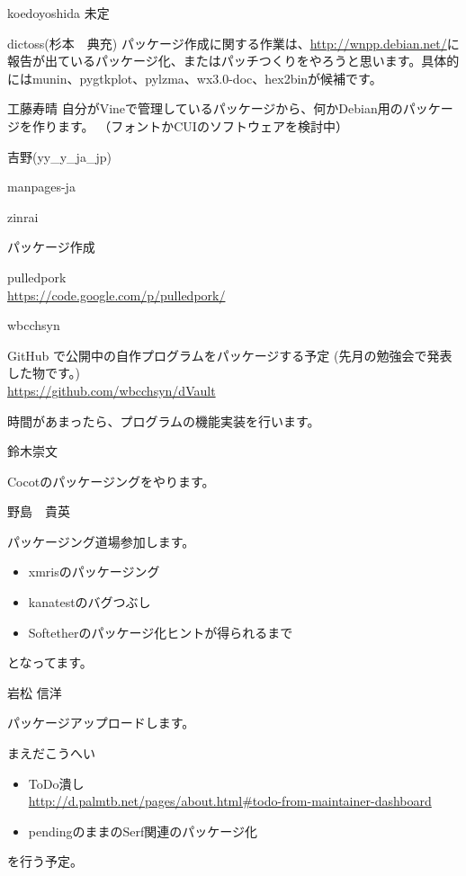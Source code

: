 \begin{prework}{ koedoyoshida }
未定
\end{prework}

\begin{prework}{ dictoss(杉本　典充) }
パッケージ作成に関する作業は、\url{http://wnpp.debian.net/}に報告が出ているパッケージ化、またはパッチつくりをやろうと思います。具体的にはmunin、pygtkplot、pylzma、wx3.0-doc、hex2binが候補です。
\end{prework}

\begin{prework}{ 工藤寿晴 }
自分がVineで管理しているパッケージから、何かDebian用のパッケージを作ります。
（フォントかCUIのソフトウェアを検討中）
\end{prework}

\begin{prework}{ 吉野(yy\_y\_ja\_jp) }

manpages-ja
\end{prework}

\begin{prework}{ zinrai }

パッケージ作成

pulledpork\\
\url{https://code.google.com/p/pulledpork/}
\end{prework}

\begin{prework}{ wbcchsyn }

GitHub で公開中の自作プログラムをパッケージする予定
(先月の勉強会で発表した物です。)\\
\url{https://github.com/wbcchsyn/dVault}

時間があまったら、プログラムの機能実装を行います。
\end{prework}

\begin{prework}{ 鈴木崇文 }

Cocotのパッケージングをやります。
\end{prework}

\begin{prework}{ 野島　貴英 }

パッケージング道場参加します。
\begin{itemize}
\item xmrisのパッケージング
\item kanatestのバグつぶし
\item Softetherのパッケージ化ヒントが得られるまで 
\end{itemize}
となってます。
\end{prework}

\begin{prework}{ 岩松 信洋 }

パッケージアップロードします。
\end{prework}

\begin{prework}{ まえだこうへい }
\begin{itemize}
\item ToDo潰し\\
\url{http://d.palmtb.net/pages/about.html#todo-from-maintainer-dashboard}
\item pendingのままのSerf関連のパッケージ化
\end{itemize}
を行う予定。

\end{prework}
